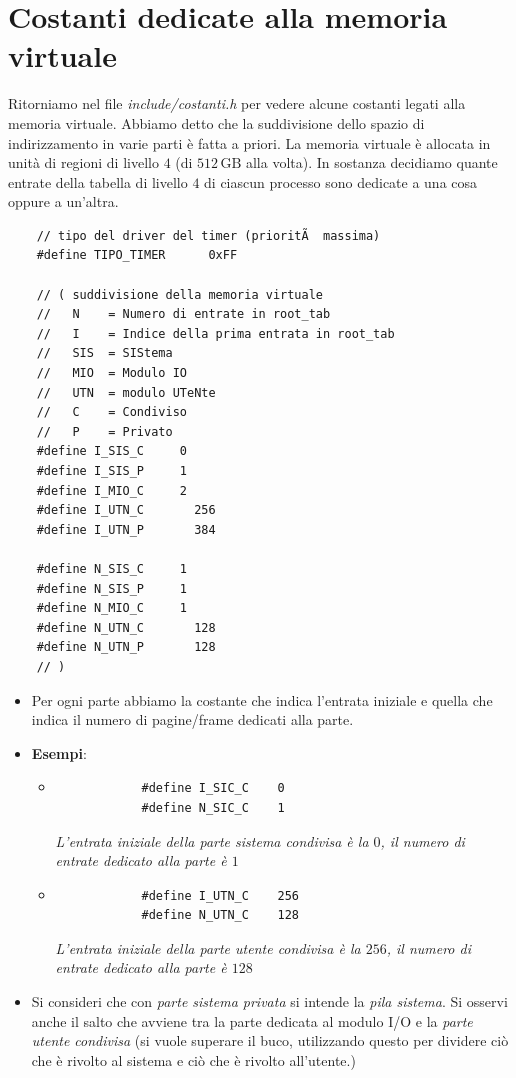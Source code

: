 \section{Costanti dedicate alla memoria virtuale}
Ritorniamo nel file \emph{include/costanti.h} per vedere alcune costanti legati alla memoria virtuale. Abbiamo detto che la suddivisione dello spazio di indirizzamento in varie parti è fatta a priori. La memoria virtuale è allocata in unità di regioni di livello $4$ (di $512\,\text{GB}$ alla volta). In sostanza decidiamo quante entrate della tabella di livello $4$ di ciascun processo sono dedicate a una cosa oppure a un'altra.
\begin{verbatim}
	// tipo del driver del timer (prioritÃ  massima)
	#define TIPO_TIMER		0xFF
	
	// ( suddivisione della memoria virtuale
	//   N    = Numero di entrate in root_tab
	//   I	  = Indice della prima entrata in root_tab
	//   SIS  = SIStema
	//   MIO  = Modulo IO
	//   UTN  = modulo UTeNte
	//   C    = Condiviso
	//   P    = Privato
	#define I_SIS_C		0
	#define I_SIS_P		1
	#define I_MIO_C		2
	#define I_UTN_C       256
	#define I_UTN_P	      384
	
	#define N_SIS_C		1
	#define N_SIS_P		1
	#define N_MIO_C		1
	#define N_UTN_C	      128
	#define N_UTN_P	      128 
	// )
\end{verbatim}
\begin{itemize}
	\item Per ogni parte abbiamo la costante che indica l'entrata iniziale e quella che indica il numero di pagine/frame dedicati alla parte.
	\item \textbf{Esempi}:
	\begin{itemize}
		\item \begin{verbatim}
			#define I_SIC_C    0
			#define N_SIC_C    1
		\end{verbatim}
		\emph{L'entrata iniziale della parte sistema condivisa è la $0$, il numero di entrate dedicato alla parte è $1$}
		\item \begin{verbatim}
			#define I_UTN_C    256
			#define N_UTN_C    128
		\end{verbatim}
		\emph{L'entrata iniziale della parte utente condivisa è la $256$, il numero di entrate dedicato alla parte è $128$}
	\end{itemize}
	\item Si consideri che con \emph{parte sistema privata} si intende la \emph{pila sistema}. Si osservi anche il salto che avviene tra la parte dedicata al modulo I/O e la \emph{parte utente condivisa} (si vuole superare il buco, utilizzando questo per dividere ciò che è rivolto al sistema e ciò che è rivolto all'utente.)
\end{itemize}

